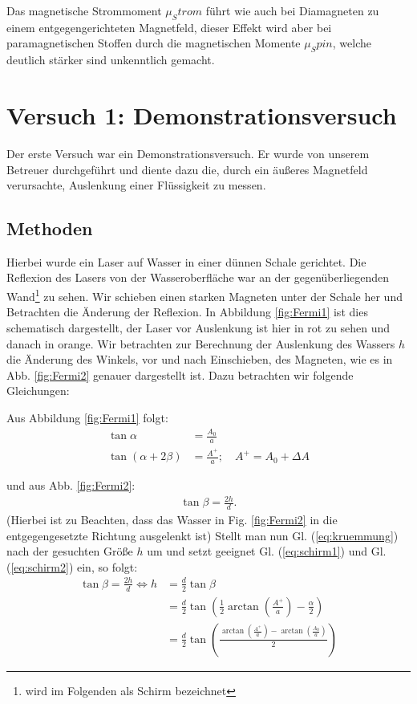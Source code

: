 \documentclass[11pt,a4paper,titlepage, ngerman]{article}
\newcommand{\refeq}[1]{Gl. (\ref{eq:#1})}
\newcommand{\reffig}[1]{Fig. \ref{fig:#1}}
\begin{document}
			Das magnetische Strommoment $\mu _Strom$ führt wie auch bei Diamagneten zu einem entgegengerichteten Magnetfeld, dieser Effekt wird aber bei paramagnetischen Stoffen durch die magnetischen Momente $\mu _Spin$, welche deutlich stärker sind unkenntlich gemacht.
			
	\section{Versuch 1: Demonstrationsversuch} 
		
		Der erste Versuch war ein Demonstrationsversuch. Er wurde von unserem Betreuer durchgeführt und diente dazu die, durch ein äußeres Magnetfeld verursachte, Auslenkung einer Flüssigkeit zu messen.
		
		\subsection*{Methoden} 
		
		Hierbei wurde ein Laser auf Wasser in einer dünnen Schale gerichtet. Die Reflexion des Lasers von der Wasseroberfläche war an der gegenüberliegenden Wand\footnote{wird im Folgenden als Schirm bezeichnet} zu sehen. Wir schieben einen starken Magneten unter der Schale her und Betrachten die Änderung der Reflexion.
		In Abbildung \ref{fig:Fermi1} ist dies schematisch dargestellt, der Laser vor Auslenkung ist hier in rot zu sehen und danach in orange. Wir betrachten zur Berechnung der Auslenkung des Wassers $h$ die Änderung des Winkels, vor und nach Einschieben, des Magneten, wie es in Abb. \ref{fig:Fermi2} genauer dargestellt ist. Dazu betrachten wir folgende Gleichungen:
		
		Aus Abbildung \ref{fig:Fermi1} folgt:
		\begin{align}
			\tan \alpha &= \frac{A_0}{a}
			\label{eq:schirm1}\\
			\tan (\alpha + 2 \beta) &= \frac{A^+}{a};\quad A^+ = A_0+\Delta A
			\label{eq:schirm2}
		\end{align}
		
		und aus Abb. \ref{fig:Fermi2}: 
			\begin{align}
			\tan \beta = \frac{2 h}{d}.
			\label{eq:kruemmung}
		\end{align}
		(Hierbei ist zu Beachten, dass das Wasser in \reffig{Fermi2} in die entgegengesetzte Richtung ausgelenkt ist)										
		Stellt man nun \refeq{kruemmung} nach der gesuchten Größe $h$ um und setzt geeignet \refeq{schirm1} und \refeq{schirm2} ein, so folgt:	
		\begin{align}
			\tan \beta = \frac{2h}{d} \Leftrightarrow h &= \frac{d}{2} \tan \beta\\
			&= \frac{d}{2} \tan \left( \frac{1}{2}\arctan \left( \frac{A^+}{a}\right) - \frac{\alpha}{2}\right)\\
			&= \frac{d}{2} \tan \left( \frac{\arctan \left( \frac{A^+}{a}\right) - \arctan\left( \frac{A_0}{a}\right)}{2} \right) \label{eq:auslenkung}
		\end{align}
		
\end{document}
